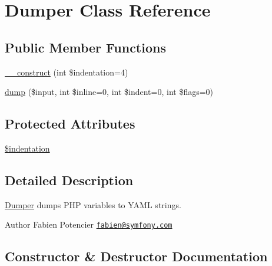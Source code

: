 \hypertarget{class_symfony_1_1_component_1_1_yaml_1_1_dumper}{}\section{Dumper Class Reference}
\label{class_symfony_1_1_component_1_1_yaml_1_1_dumper}
\subsection*{Public Member Functions}
\begin{DoxyCompactItemize}
\item 
\mbox{\hyperlink{class_symfony_1_1_component_1_1_yaml_1_1_dumper_a8f511d67e60c2e9a3c240a51357007d3}{\+\_\+\+\_\+construct}} (int \$indentation=4)
\item 
\mbox{\hyperlink{class_symfony_1_1_component_1_1_yaml_1_1_dumper_a0d32fea4539607989ec7894bc321d09c}{dump}} (\$input, int \$inline=0, int \$indent=0, int \$flags=0)
\end{DoxyCompactItemize}
\subsection*{Protected Attributes}
\begin{DoxyCompactItemize}
\item 
\mbox{\hyperlink{class_symfony_1_1_component_1_1_yaml_1_1_dumper_aff1f1ea116fe6e27da24f330c01d8718}{\$indentation}}
\end{DoxyCompactItemize}


\subsection{Detailed Description}
\mbox{\hyperlink{class_symfony_1_1_component_1_1_yaml_1_1_dumper}{Dumper}} dumps P\+HP variables to Y\+A\+ML strings.

\begin{DoxyAuthor}{Author}
Fabien Potencier \href{mailto:fabien@symfony.com}{\tt fabien@symfony.\+com}
\end{DoxyAuthor}


\subsection{Constructor \& Destructor Documentation}
\mbox{\label{class_symfony_1_1_component_1_1_yaml_1_1_dumper_a8f511d67e60c2e9a3c240a51357007d3}} 

